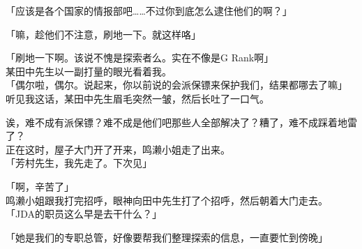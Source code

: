 「应该是各个国家的情报部吧……不过你到底怎么逮住他们的啊？」

「嘛，趁他们不注意，刷地一下。就这样咯」

「刷地一下啊。该说不愧是探索者么。实在不像是G Rank啊」\\

某田中先生以一副打量的眼光看着我。\\

「偶尔啦，偶尔。说起来，你以前说的会派保镖来保护我们，结果都哪去了嘛」\\

听见我这话，某田中先生眉毛突然一皱，然后长吐了一口气。

诶，难不成有派保镖？难不成是他们吧那些人全部解决了？糟了，难不成踩着地雷了？\\

正在这时，屋子大门开了开来，鸣濑小姐走了出来。\\

「芳村先生，我先走了。下次见」

「啊，辛苦了」\\

鸣濑小姐跟我打完招呼，眼神向田中先生打了个招呼，然后朝着大门走去。\\

「JDA的职员这么早是去干什么？」

「她是我们的专职总管，好像要帮我们整理探索的信息，一直要忙到傍晚」

